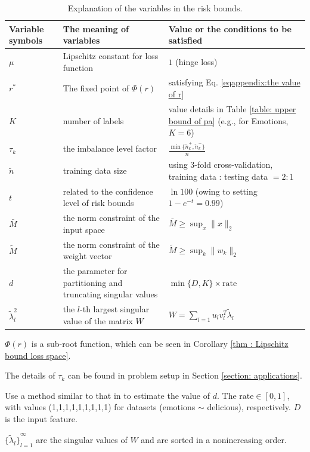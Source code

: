 \documentclass{article}
\begin{document}
\begin{table}
\caption{Explanation of the variables in the risk bounds. 
}
\label{table:variables in bounds}
\centering
\begin{threeparttable} 
\begin{tabular}{p{3cm}p{4cm}p{5cm}}
\toprule
Variable symbols  & The meaning of variables & Value or the conditions to be satisfied    \\
\midrule
$\mu$ & Lipschitz constant for loss function & $1$ (hinge loss) \\
$r^*$ & The fixed point of $\Phi(r)$\tnote{1} & satisfying Eq. \eqref{eqappendix:the value of r} \\
$K$ & number of labels & value details in Table \ref{table: upper bound of pa} (e.g., for Emotions, $K=6$) \\
$\tau_k$ & the imbalance level factor \tnote{2}& $\frac{\min \{ \tilde{n}_k^+, \tilde{n}_k^- \}}{n}$ \\
$\tilde{n}$ & training data size  & using 3-fold cross-validation, training data : testing data $= 2:1$ \\
$t$ & related to the confidence level of risk bounds  & $\ln 100$ (owing to setting $1-e^{-t}=0.99$) \\
$\bar{M}$ & the norm constraint of the input space & $\bar{M} \geq \sup_x \| x \|_2$ \\
$\widetilde{M}$ & the norm constraint of the weight vector & $\widetilde{M} \geq \sup_k \|w_k\|_2$ \\
$d$ & the parameter for partitioning and truncating singular values\tnote{3} & $ \min\{ D, K\} \times \text{rate}$ \\
$\widetilde{\lambda}^2_{l}$ & the $l$-th largest singular value \tnote{4} of the matrix $W$  & $W=\sum_{l = 1}u_lv_l^T \widetilde{\lambda}_{l}$ \\
\bottomrule
\end{tabular}


\begin{tablenotes}
    \footnotesize
    \item[1] $\Phi(r)$ is a sub-root function, which can be seen in Corollary \ref{thm : Lipschitz bound loss space}.
    \item[2] The details of $\tau_k$ can be found in problem setup in Section \ref{section: applications}.
    \item[3] Use a method similar to that in \cite{experiment23li} to estimate the value of $d$. The $\text{rate} \in [0,1]$, with values (1,1,1,1,1,1,1,1,1) for datasets (emotions $\sim$ delicious), respectively. $D$ is the input feature. 
    \item[4] ${\{\widetilde{\lambda}_l\}}_{l = 1}^{\infty}$ are the singular values of $W$ and are sorted in a nonincreasing order.
\end{tablenotes}


\end{threeparttable}
\end{table}
\end{document}

